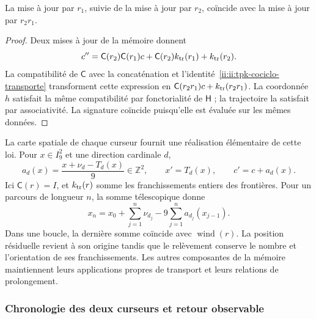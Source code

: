 \begin{proposition}
\label{ii:ii:tpk-composicion-afin}
La mise à jour par \(r_1\), suivie de la mise à jour par \(r_2\), coïncide avec la mise à jour par \(r_2r_1\).
\end{proposition}
\begin{proof}
Deux mises à jour de la mémoire donnent
\[
 c''=\mathsf C(r_2)\mathsf C(r_1)c
       +\mathsf C(r_2)k_{\rm tr}(r_1)+k_{\rm tr}(r_2).
\]
La compatibilité de \(\mathsf C\) avec la concaténation et l'identité~\eqref{ii:ii:tpk-cociclo-transporte} transforment cette expression en \(\mathsf C(r_2r_1)c+k_{\rm tr}(r_2r_1)\). La coordonnée \(h\) satisfait la même compatibilité par fonctorialité de \(\mathsf H\) ; la trajectoire la satisfait par associativité. La signature coïncide puisqu'elle est évaluée sur les mêmes données.
\end{proof}

La carte spatiale de chaque curseur fournit une réalisation élémentaire de cette loi. Pour \(x\in I_9^2\) et une direction cardinale \(d\),
\[
 a_d(x)=\frac{x+\nu_d-T_d(x)}9\in\mathbb Z^2,
 \qquad x'=T_d(x),\qquad c'=c+a_d(x).
\]
Ici \(\mathsf C(r)=I\), et \(k_{\rm tr}(r)\) somme les franchissements entiers des frontières. Pour un parcours de longueur \(n\), la somme télescopique donne
\[
 x_n=x_0+\sum_{j=1}^n\nu_{d_j}
             -9\sum_{j=1}^n a_{d_j}(x_{j-1}).
\]
Dans une boucle, la dernière somme coïncide avec \(\operatorname{wind}(r)\). La position résiduelle revient à son origine tandis que le relèvement conserve le nombre et l'orientation de ses franchissements. Les autres composantes de la mémoire maintiennent leurs applications propres de transport et leurs relations de prolongement.

\subsubsection{Chronologie des deux curseurs et retour observable}

